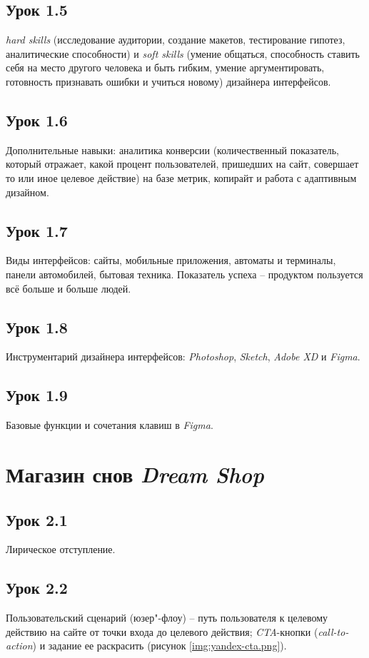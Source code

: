 \documentclass[variant=practice]{bsuir}
\begin{document}
\subsection{Урок 1.5} \textit{hard skills} (исследование аудитории, создание
макетов, тестирование гипотез, аналитические способности) и \textit{soft skills}
(умение общаться, способность ставить себя на место другого человека и быть
гибким, умение аргументировать, готовность признавать ошибки и учиться новому)
дизайнера интерфейсов.

\subsection{Урок 1.6} Дополнительные навыки: аналитика конверсии (количественный
показатель, который отражает, какой процент пользователей, пришедших на сайт,
совершает то или иное целевое действие) на базе метрик, копирайт и работа с
адаптивным дизайном.

\subsection{Урок 1.7} Виды интерфейсов: сайты, мобильные приложения, автоматы и
терминалы, панели автомобилей, бытовая техника. Показатель успеха -- продуктом
пользуется всё больше и больше людей.

\subsection{Урок 1.8} Инструментарий дизайнера интерфейсов: \textit{Photoshop},
\textit{Sketch}, \textit{Adobe XD} и \textit{Figma}.

\subsection{Урок 1.9} Базовые функции и сочетания клавиш в \textit{Figma}.

\section{Магазин снов \textit{Dream Shop}}

\subsection{Урок 2.1} Лирическое отступление.

\subsection{Урок 2.2} Пользовательский сценарий (юзер"-флоу) -- путь
пользователя к целевому действию на сайте от точки входа до целевого действия;
\textit{CTA}-кнопки (\textit{call-to-action}) и задание ее раскрасить (рисунок
\ref{img:yandex-cta.png}).
\end{document}
